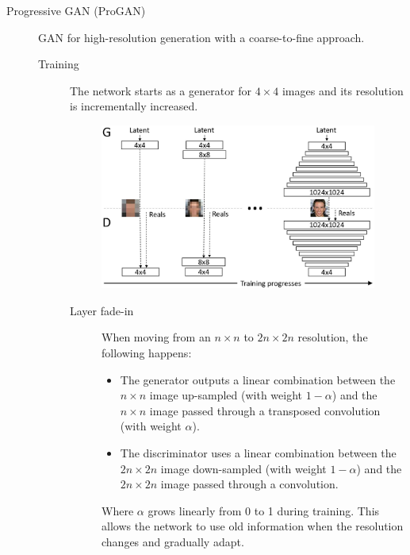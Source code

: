\begin{description}
    \item[Progressive GAN (ProGAN)] 
        GAN for high-resolution generation with a coarse-to-fine approach. 
        
        \begin{description}
            \item[Training] 
                The network starts as a generator for $4 \times 4$ images and its resolution is incrementally increased.

                \begin{figure}[H]
                    \centering
                    \includegraphics[width=0.65\linewidth]{./img/_progan.jpg}
                \end{figure}

                \begin{description}
                    \item[Layer fade-in] 
                        When moving from an $n \times n$ to $2n \times 2n$ resolution, the following happens:
                        \begin{itemize}
                            \item The generator outputs a linear combination between the $n \times n$ image up-sampled (with weight $1-\alpha$) and the $n \times n$ image passed through a transposed convolution (with weight $\alpha$).
                            \item The discriminator uses a linear combination between the $2n \times 2n$ image down-sampled (with weight $1-\alpha$) and the $2n \times 2n$ image passed through a convolution.
                        \end{itemize}
                        Where $\alpha$ grows linearly from 0 to 1 during training. This allows the network to use old information when the resolution changes and gradually adapt.


\end{description}
\end{description}
\end{description}
